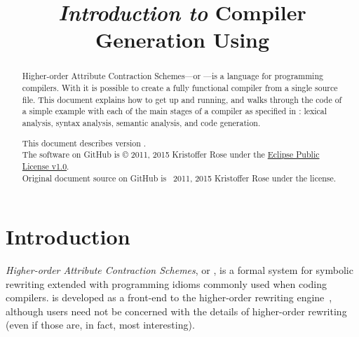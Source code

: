 \documentclass[12pt]{article} %
\title{
  \emph{Introduction to} Compiler Generation Using \HAX
}
\author{
  \authorname1{Kristoffer H. Rose}
  \authorinstitution1{Two Sigma Investments \also New York University}
}
\newcommand{\basecopyright}{Original document source on GitHub is \doclicenseIcon~2011, 2015
  Kristoffer Rose under the \href{\doclicenseURL}{\doclicenseName} license.}
\newcommand{\documentcopyright}{\basecopyright}
\begin{document}
\maketitle

\begin{abstract}\noindent
  Higher-order Attribute Contraction Schemes---or \HAX---is a language for programming compilers.
  With \HAX it is possible to create a fully functional compiler from a single source file.  This
  document explains how to get \HAX up and running, and walks through the code of a simple example
  with each of the main stages of a compiler as specified in \HAX: lexical analysis, syntax
  analysis, semantic analysis, and code generation.

  \compacttableofcontents

  \vspace*{2em} \footnotesize\color{gray}\noindent%
  This document describes \HAX version \version.\\[1ex]
  The \HAX software on GitHub is © 2011, 2015 Kristoffer Rose under the \href{https://www.eclipse.org/legal/epl-v10.html}{Eclipse Public License v1.0}.\\[1ex]
  \documentcopyright
\end{abstract}


\section{Introduction}\label{sec:intro}

\emph{Higher-order Attribute Contraction Schemes}, or \HAX, is a formal system for symbolic
rewriting extended with programming idioms commonly used when coding compilers. \HAX is developed as
a front-end to the \CRSX higher-order rewriting engine~\cite{crsx}, although \HAX users need not be
concerned with the details of higher-order rewriting (even if those are, in fact, most interesting).
\end{document}
